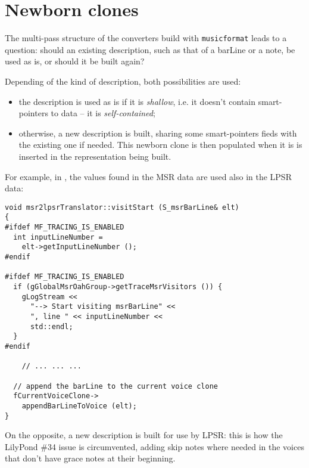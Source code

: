\section{Newborn clones}

The multi-pass structure of the converters build with {\tt musicformat} leads to a question: should an existing description, such as that of a barLine or a note, be used as is, or should it be built again?

Depending of the kind of description, both possibilities are used:
\begin{itemize}
\item the description is used as is if it is {\it shallow}, i.e. it doesn't contain smart-pointers to data -- it is {\it self-contained};
\item otherwise, a new description is built, sharing some smart-pointers fieds with the existing one if needed. This newborn clone is then populated when it is is inserted in the representation being built.
\end{itemize}

For example, in \msrToLpsr{}, the  values found in the MSR data are used also in the LPSR data:
\begin{lstlisting}[language=CPlusPlus]
void msr2lpsrTranslator::visitStart (S_msrBarLine& elt)
{
#ifdef MF_TRACING_IS_ENABLED
  int inputLineNumber =
    elt->getInputLineNumber ();
#endif

#ifdef MF_TRACING_IS_ENABLED
  if (gGlobalMsrOahGroup->getTraceMsrVisitors ()) {
    gLogStream <<
      "--> Start visiting msrBarLine" <<
      ", line " << inputLineNumber <<
      std::endl;
  }
#endif

	// ... ... ...

  // append the barLine to the current voice clone
  fCurrentVoiceClone->
    appendBarLineToVoice (elt);
}
\end{lstlisting}

On the opposite, a new  description is built for use by LPSR: this is how the LilyPond \#34 issue is circumvented, adding skip notes where needed in the voices that don't have grace notes at their beginning.

